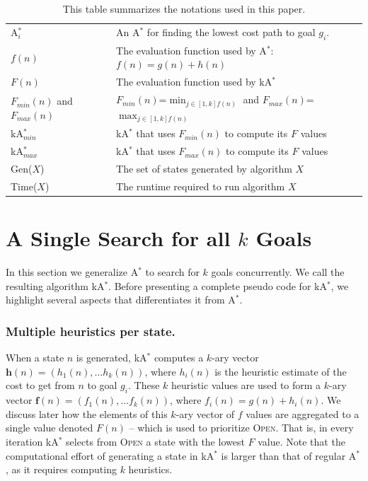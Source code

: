 \documentclass{aicom2e}
\newcommand{\astar}{A$^*$}
\newcommand{\kastar}{kA$^*$}
\newcommand{\kastarmin}{kA$^*_{min}$}
\newcommand{\kastarmax}{kA$^*_{max}$}
\newcommand{\astari}[1]{A$^*_#1$}
\newcommand{\minf}{$F_{min}(n)$}
\newcommand{\maxf}{$F_{max}(n)$}
\newcommand{\open}{\textsc{Open}}
\begin{document}
\begin{table}
	\scriptsize
\begin{tabular}{|m{2cm}|m{5.5cm}|}
        \hline
        \astari{i}  & An \astar{} for finding the lowest cost path to goal $g_i$. \\
        $f(n)$      & The evaluation function used by \astar{}: $f(n)=g(n)+h(n)$ \\
		$F(n)$      & The evaluation function used by \kastar{} \\
		
		\minf{} and \maxf{} & \minf{}=$\min_{j\in[1,k] f(n)}$ and \maxf{}= $\max_{j\in[1,k] f(n)}$\\	
        \kastarmin{} & \kastar{} that uses \minf{} to compute its $F$ values\\		
        \kastarmax{} & \kastar{} that uses \maxf{} to compute its $F$ values\\		
        Gen($X$)    & The set of states generated by algorithm $X$ \\
        Time($X$)   & The runtime required to run algorithm $X$ \\

        \hline
    \end{tabular}
\caption{This table summarizes the notations used in this paper.}
\label{tab:notations}
\end{table}


\section{A Single Search for all  $k$ Goals}
\label{sec:one-k-goal-search}

In this section we generalize \astar{} to search for $k$ goals concurrently. We
call the resulting algorithm \kastar{}. Before presenting a complete pseudo
code for \kastar{}, we highlight several aspects that differentiates it from \astar{}.

\subsubsection*{Multiple heuristics per state.}


When a state $n$ is generated, \kastar{} computes a $k$-ary vector
$\textbf{h}(n)=(h_1(n),\ldots h_k(n))$, where $h_i(n)$ is the heuristic
estimate of the cost to get from $n$ to goal $g_i$. These $k$ heuristic values
are used to form a $k$-ary vector $\textbf{f}(n)=(f_1(n),\ldots f_k(n))$, where
$f_i(n)=g(n)+h_i(n)$. We discuss later how the elements of this $k$-ary vector
of $f$ values are aggregated to a single value denoted $F(n)$ -- which is used
to prioritize
\open. That is, in every iteration \kastar{} selects from \open{} a state with
the lowest $F$ value. Note that the computational effort of generating a state
in \kastar{} is larger than that of regular \astar{}, as it requires computing
$k$ heuristics.
\end{document}
